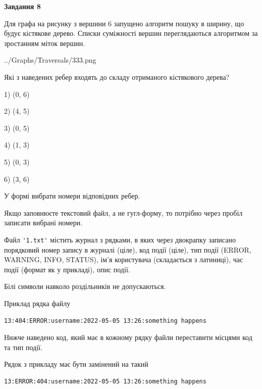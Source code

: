 \documentclass[12pt, ukrainian]{article}
\def\code#1{\Verb!#1!}
\begin{document}
{\begin {large}
{\begin {center}\textbf{Завдання 8}\end {center}}\par
Для графа на рисунку з вершини 6 запущено алгоритм пошуку в ширину, що будує кістякове дерево. Списки суміжності вершин переглядаються алгоритмом за зростанням міток вершин.\par
\begin{center}
	{../Graphs/Traversals/333.png}
\end{center}
\par Які з наведених ребер входять до складу отриманого кістякового дерева?\par
1) (0, 6)\par
2) (4, 5)\par
3) (0, 5)\par
4) (1, 3)\par
5) (0, 3)\par
6) (3, 6)\par
{\vskip 15pt} У формі вибрати номери відповідних ребер.


Якщо заповнюєте текстовий файл, а не гугл-форму, то потрібно через пробіл записа\-ти вибрані номери.\par
\newpage


Файл \code{'1.txt'} містить журнал з рядками, в яких через двокрапку записано поряд\-ко\-вий номер запису в журналі (ціле), код події (ціле), тип події (ERROR,\\ WARNING, INFO, STATUS), ім'я користувача (складається з латиниці), час події (фор\-мат як у прикладі), опис події.

Білі символи навколо роздільників не допускаються.

Приклад рядка файлу



\begin{verbatim}
13:404:ERROR:username:2022-05-05 13:26:something happens
\end{verbatim}


Нижче наведено код, який має в кожному рядку файли переставити місцями код та тип події.

Рядок з прикладу має бути замінений на такий



\begin{verbatim}
13:ERROR:404:username:2022-05-05 13:26:something happens
\end{verbatim}





\end{large}}
\end{document}
